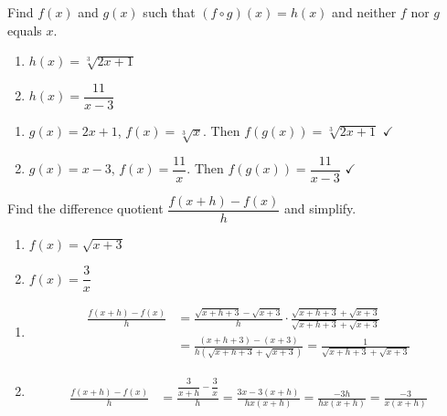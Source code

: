 \documentclass{ximera}
\begin{document}
\begin{problem}
Find $f(x)$ and $g(x)$ such that $(f\circ g)(x) = h(x)$ and neither $f$ nor $g$ equals $x$.
\begin{enumerate}
  \item[(a)] $h(x) = \sqrt[3]{2x+1}$
  \medskip
  \item[(b)] $h(x) = \dfrac{11}{x-3}$
\end{enumerate}

\begin{solution}
\begin{enumerate}
  \item[(a)] $g(x) = 2x+1$, $f(x) = \sqrt[3]{x}$. Then $f(g(x)) = \sqrt[3]{2x+1}$ $\checkmark$

  \item[(b)] $g(x) = x-3$, $f(x) = \dfrac{11}{x}$. Then $f(g(x)) = \dfrac{11}{x-3}$ $\checkmark$
\end{enumerate}
\end{solution}
\end{problem}


\begin{problem}
Find the difference quotient $\dfrac{f(x+h)-f(x)}{h}$ and simplify.
\begin{enumerate}
  \item[(a)] $f(x) = \sqrt{x+3}$
  \medskip
  \item[(b)] $f(x) = \dfrac{3}{x}$
\end{enumerate}

\begin{solution}
\begin{enumerate}
  \item[(a)]
  \begin{align*}
    \frac{f(x+h)-f(x)}{h} &= \frac{\sqrt{x+h+3}-\sqrt{x+3}}{h}\cdot\frac{\sqrt{x+h+3}+\sqrt{x+3}}{\sqrt{x+h+3}+\sqrt{x+3}}\\
    &= \frac{(x+h+3)-(x+3)}{h(\sqrt{x+h+3}+\sqrt{x+3})} = \frac{1}{\sqrt{x+h+3}+\sqrt{x+3}}
  \end{align*}

  \item[(b)]
  \begin{align*}
    \frac{f(x+h)-f(x)}{h} &= \frac{\dfrac{3}{x+h}-\dfrac{3}{x}}{h} = \frac{3x-3(x+h)}{hx(x+h)} = \frac{-3h}{hx(x+h)} = \frac{-3}{x(x+h)}
  \end{align*}
\end{enumerate}
\end{solution}
\end{problem}
\end{document}
